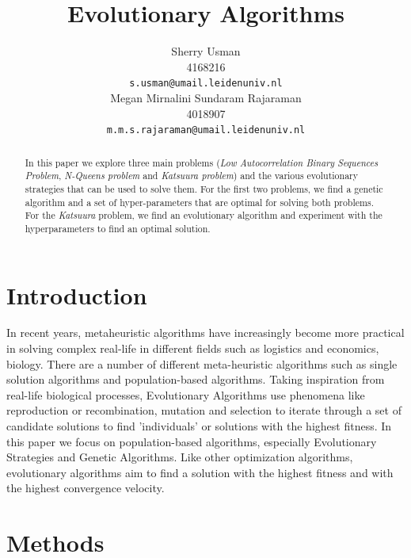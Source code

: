 \documentclass{article}
\title{Evolutionary Algorithms}
\author{
 Sherry Usman\\
  4168216\\
  \texttt{s.usman@umail.leidenuniv.nl}\\
   \And
 Megan Mirnalini Sundaram Rajaraman\\
  4018907\\
  \texttt{m.m.s.rajaraman@umail.leidenuniv.nl} \\
}
\begin{document}
\maketitle
 \begin{abstract}
In this paper we explore three main problems (\emph{Low Autocorrelation Binary Sequences Problem}, \emph{N-Queens problem} and \emph{Katsuura problem}) and the various evolutionary strategies that can be used to solve them. For the first two problems, we find a genetic algorithm and a set of hyper-parameters that are optimal for solving both problems. For the \emph{Katsuura} problem,  we find an evolutionary algorithm and experiment with the hyperparameters to find an optimal solution. 
\end{abstract}




\section{Introduction}\label{sec:intro}
In recent years, metaheuristic algorithms have increasingly become more practical in solving complex real-life in different fields such as logistics and economics, biology.  There are a number of different meta-heuristic algorithms such as single solution algorithms and population-based algorithms. Taking inspiration from real-life biological processes, Evolutionary Algorithms use phenomena like reproduction or recombination, mutation and selection to iterate through a set of candidate solutions to find 'individuals' or solutions with the highest fitness. In this paper we focus on population-based algorithms, especially Evolutionary Strategies and Genetic Algorithms. Like other optimization algorithms, evolutionary algorithms aim to find a solution with the highest fitness and with the highest convergence velocity. 
\section{Methods}
\end{document}

